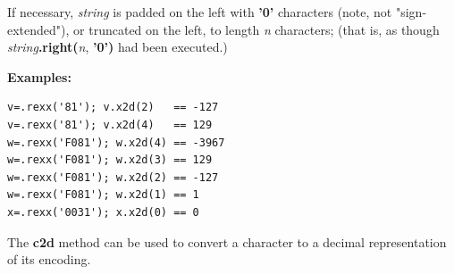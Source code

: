 If necessary, \emph{string} is padded on the left
with \textbf{'0'} characters (note, not "sign-extended"), or
truncated on the left, to length \emph{n} characters; (that is, as
though \emph{string}\textbf{.right(}\emph{n}, \textbf{'0')}
had been executed.)
 
\textbf{Examples:}
\begin{lstlisting}
v=.rexx('81'); v.x2d(2)   == -127
v=.rexx('81'); v.x2d(4)   == 129
w=.rexx('F081'); w.x2d(4) == -3967
w=.rexx('F081'); w.x2d(3) == 129
w=.rexx('F081'); w.x2d(2) == -127
w=.rexx('F081'); w.x2d(1) == 1
x=.rexx('0031'); x.x2d(0) == 0
\end{lstlisting}
 The  \textbf{c2d} method %
 can be used to convert
a character to a decimal representation of its encoding.
